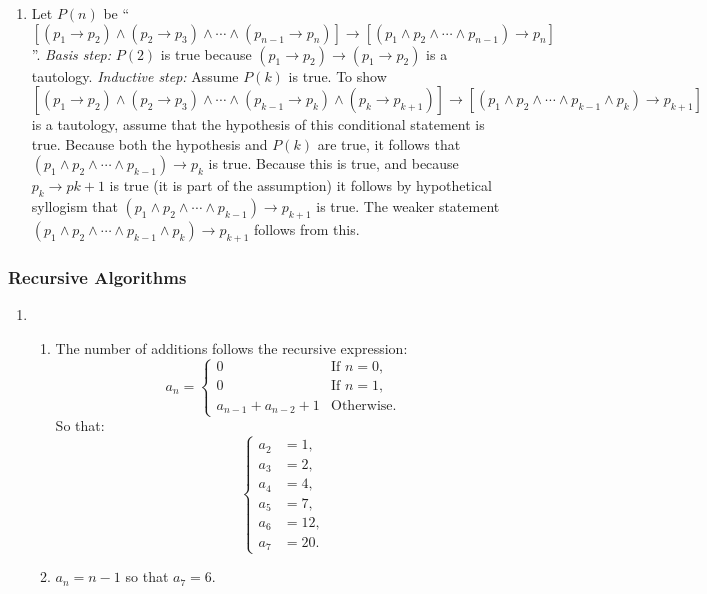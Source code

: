 \documentclass{../../cls/sig-alternate-05-2015}
\begin{document}
\begin{enumerate}
\item Let $P(n)$ be \textquotedblleft $[(p_1 \rightarrow p_2) \wedge (p_2 \rightarrow p_3) \wedge \cdots \wedge (p_{n - 1} \rightarrow p_n)] \rightarrow [(p_1 \wedge p_2 \wedge \cdots \wedge p_{n - 1}) \rightarrow p_n]$\textquotedblright . \textit{Basis step:} $P(2)$ is true because $(p_1 \rightarrow p_2) \rightarrow (p_1 \rightarrow p_2)$ is a tautology. \textit{Inductive step:} Assume $P(k)$ is true. To show $[(p_1 \rightarrow p_2) \wedge (p_2 \rightarrow p_3) \wedge \cdots \wedge (p_{k - 1} \rightarrow p_k) \wedge (p_k \rightarrow p_{k + 1})] \rightarrow [(p_1 \wedge p_2 \wedge \cdots \wedge p_{k - 1} \wedge p_k) \rightarrow p_{k + 1}]$ is a tautology, assume that the hypothesis of this conditional
statement is true. Because both the hypothesis and $P(k)$ are
true, it follows that $(p_1 \wedge p_2 \wedge \cdots \wedge p_{k - 1}) \rightarrow p_k$ is true. Because
this is true, and because $p_k \rightarrow p{k + 1}$ is true (it is part
of the assumption) it follows by hypothetical syllogism that
$(p_1 \wedge p_2 \wedge \cdots \wedge p_{k - 1}) \rightarrow p_{k + 1}$ is true. The weaker statement $(p_1 \wedge p_2 \wedge \cdots \wedge p_{k - 1} \wedge p_k) \rightarrow p_{k + 1}$ follows from this.
\end{enumerate}

\subsubsection{Recursive Algorithms}
\begin{enumerate}
\item \begin{enumerate}
	\item The number of additions follows the recursive expression:\begin{equation}
		a_n = \begin{cases}
		0 & \text{If } n = 0,\\
		0 & \text{If } n = 1,\\
		a_{n - 1} + a_{n - 2} + 1 & \text{Otherwise.}
		\end{cases}
	\end{equation} So that: \begin{equation}
		\begin{cases}
		a_2 & = 1,\\
		a_3 & = 2,\\
		a_4 & = 4,\\
		a_5 & = 7,\\
		a_6 & = 12,\\
		a_7 & = 20.
		\end{cases}
	\end{equation}
	\item $a_n = n - 1$ so that $a_7 = 6$.
\end{enumerate}
\end{enumerate}
\end{document}
